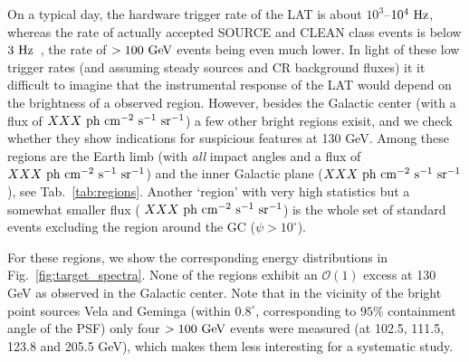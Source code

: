 \documentclass[aps,twocolumn,prd,superscriptaddress,showpacs,nofootinbib,fixfloat]{revtex4}
\newcommand{\s}{{\rm ~s}}
\newcommand{\cm}{{\rm ~cm}}
\newcommand{\ph}{{\rm ~ph}}
\newcommand{\sr}{{\rm ~sr}}
\newcommand{\Hz}{{\rm ~Hz}}
\newcommand{\GeV}{{\rm ~GeV}}
\begin{document}
On a typical day, the hardware trigger rate of the LAT is
about $10^3$--$10^4\Hz$, whereas the rate of actually
accepted SOURCE and CLEAN class events is below
$3\Hz$~\citep{collaboration:2012kca}, the rate of $>100\GeV$ events
being even much lower. In light of these low trigger rates
(and assuming steady sources and CR background fluxes) it
it difficult to imagine that the instrumental response of the LAT
would depend on the brightness of a observed region.
However, besides the Galactic center (with a flux of $XXX
\ph\cm^{-2}\s^{-1}\sr^{-1}$) a few other bright regions
exisit, and we check whether they show indications for
suspicious features at 130 GeV. Among these regions are the
Earth limb (with \emph{all} impact angles and a flux of $XXX
\ph \cm^{-2}\s^{-1}\sr^{-1}$) and the inner Galactic plane
($XXX\ph\cm^{-2}\s^{-1}\sr^{-1}$), see
Tab.~\ref{tab:regions}. Another `region' with very high
statistics but a somewhat smaller flux (
$XXX\ph\cm^{-2}\s^{-1}\sr^{-1}$) is the whole set of
standard events excluding the region around the GC
($\psi>10^\circ$).

For these regions, we show the corresponding energy
distributions in Fig.~\ref{fig:target_spectra}. None of the
regions exhibit an $\mathcal{O}(1)$ excess at 130 GeV as
observed in the Galactic center. Note that in the vicinity
of the bright point sources Vela and Geminga (within
$0.8^\circ$, corresponding to $95\%$ containment angle of
the PSF) only four $>100\GeV$ events were measured (at
102.5, 111.5, 123.8 and 205.5 GeV), which makes them less
interesting for a systematic study.
\medskip
\end{document}

